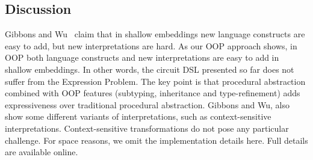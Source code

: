 \subsection{Discussion} 
Gibbons and Wu~\cite{gibbons2014folding} claim that in shallow
embeddings new language constructs are easy to add, but new
interpretations are hard. As our OOP approach shows, in OOP both
language constructs and new interpretations are easy to add in shallow
embeddings. In other words, the circuit DSL presented so far does not
suffer from the Expression Problem. The key point is that procedural
abstraction combined with OOP features (subtyping, inheritance and
type-refinement) adds expressiveness over traditional procedural
abstraction.
Gibbons and Wu, also show some different variants of interpretations, 
such as context-sensitive interpretations. 
Context-sensitive transformations do not pose any particular
challenge. For space reasons, we omit the implementation details here. Full details
are available online.

\begin{comment}
Unlike \lstinline{width} and \lstinline{wellSized} which can be defined with
only the given circuit, context-dependent interpretations may need some context.
These contexts can be captured by arguments of the method. For example, a
function that collects all the connections between wires inside a circuit would have
the following signature:
\begin{lstlisting}
type Layout = List[List[Tuple2[Int,Int]]]
def tlayout(f: Int => Int): Layout
\end{lstlisting}
where the context \lstinline{f} may vary in recursive
calls. Context-sensitive transformations do not pose any particular
challenge. For space reasons, we omit the implementation details here. Full details
are available online.
\end{comment}